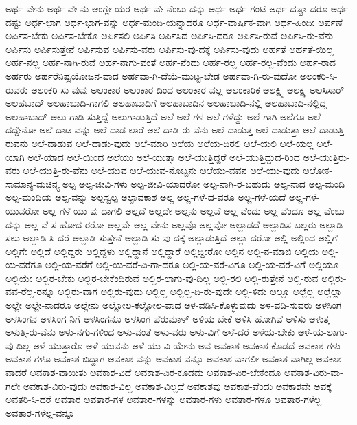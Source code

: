 {ಅರ್ಥ-ವೇನು
ಅರ್ಥ-ವೇ-ನು-ಆಂಗ್ಲೇ-ಯರ
ಅರ್ಥ-ವೇ-ನೆಂಬು-ದನ್ನು
ಅರ್ಧ
ಅರ್ಧ-ಗಂಟೆ
ಅರ್ಧ-ದಷ್ಟಾ-ದರೂ
ಅರ್ಧ-ದಷ್ಟು
ಅರ್ಧ-ಭಾಗ
ಅರ್ಧ-ಭಾಗ-ವನ್ನು
ಅರ್ಧ-ಮಂದಿ-ಯನ್ನಾದರೂ
ಅರ್ಧ-ವಾರ್ಷಿಕ-ವಾಗಿ
ಅರ್ಧ-ಹಿಂದೀ
ಅರ್ಪಣೆ
ಅರ್ಪಿಸ-ಬೇಕು
ಅರ್ಪಿಸ-ಬೇಕೊ
ಅರ್ಪಿಸಲಿ
ಅರ್ಪಿಸಿ
ಅರ್ಪಿಸಿದ
ಅರ್ಪಿಸಿ-ದರೂ
ಅರ್ಪಿಸಿ-ರುವೆ
ಅರ್ಪಿಸಿ-ರು-ವೆನು
ಅರ್ಪಿಸು
ಅರ್ಪಿಸುತ್ತೇನೆ
ಅರ್ಪಿಸುವ
ಅರ್ಪಿಸು-ವರು
ಅರ್ಪಿಸು-ವು-ದಕ್ಕೆ
ಅರ್ಪಿಸು-ವುದು
ಅರ್ಹತೆ
ಅರ್ಹತೆ-ಯಿಲ್ಲ
ಅರ್ಹ-ನಲ್ಲ
ಅರ್ಹ-ನಾಗಿ-ರುವೆ
ಅರ್ಹ-ನಾಗು-ವಂತೆ
ಅರ್ಹ-ನೆಂದು
ಅರ್ಹ-ರಲ್ಲ
ಅರ್ಹ-ರಲ್ಲ-ವೆಂದು
ಅರ್ಹ-ರಾದ
ಅರ್ಹರು
ಅರ್ಹರೆನಿಷ್ಪ್ರಯೋಜನ-ವಾದ
ಅರ್ಹವಾ-ಗಿ-ದೆಯೆ-ಮುಟ್ಟ-ಬೇಡ
ಅರ್ಹವಾ-ಗಿ-ರು-ವುದೋ
ಅಲಂಕರಿ-ಸಿ-ರುವರು
ಅಲಂಕರಿ-ಸು-ವುವು
ಅಲಂಕಾರ
ಅಲಂಕಾರ-ದಿಂದ
ಅಲಂಕಾರ-ವಲ್ಲ
ಅಲಂಕಾರಿಕ
ಅಲಕ್ಷ್ಮಿ
ಅಲಕ್ಷ್ಯ
ಅಲಸಿಸಾರ್
ಅಲಹಬಾದ್
ಅಲಹಾಬಾದಿ-ಗಾಗಲಿ
ಅಲಹಾಬಾದಿಗೆ
ಅಲಹಾಬಾದಿನ
ಅಲಹಾಬಾದಿ-ನಲ್ಲಿ
ಅಲಹಾಬಾದಿ-ನಲ್ಲಿದ್ದ
ಅಲಹಾಬಾದ್
ಅಲು-ಗಾಡಿ-ಸುತ್ತಿದ್ದೆ
ಅಲುಗಾಡುತ್ತಿದೆ
ಅಲೆ
ಅಲೆ-ಗಳ
ಅಲೆ-ಗಳೆದ್ದು
ಅಲೆ-ಗಾಗಿ
ಅಲೆಗೂ
ಅಲೆ-ದದ್ದೇನೋ
ಅಲೆ-ದಾಟ-ವನ್ನು
ಅಲೆ-ದಾಡ-ಲಾರೆ
ಅಲೆ-ದಾಡಿ-ರು-ವೆನು
ಅಲೆ-ದಾಡುತ್ತ
ಅಲೆ-ದಾಡುತ್ತಾ
ಅಲೆ-ದಾಡುತ್ತಿ-ರುವನು
ಅಲೆ-ದಾಡುವ
ಅಲೆ-ದಾಡು-ವುದು
ಅಲೆ-ಮಾರಿ
ಅಲೆಯ
ಅಲೆಯ-ದಿರಲಿ
ಅಲೆ-ಯಲಿ
ಅಲೆ-ಯಲ್ಲ
ಅಲೆ-ಯಾಗಿ
ಅಲೆ-ಯಾದ
ಅಲೆ-ಯಿಂದ
ಅಲೆಯು
ಅಲೆ-ಯುತ್ತಾ
ಅಲೆ-ಯುತ್ತಿದ್ದರೆ
ಅಲೆ-ಯುತ್ತಿದ್ದುದ-ರಿಂದ
ಅಲೆ-ಯುತ್ತಿರು-ವರು
ಅಲೆ-ಯುತ್ತಿ-ರು-ವೆನು
ಅಲೆ-ಯುವ
ಅಲೆ-ಯುವ-ನೊಬ್ಬನು
ಅಲೆಯು-ವವನ
ಅಲೆ-ಯು-ವುದು
ಅಲೋಕ-ಸಾಮಾನ್ಯ-ಮಚಿನ್ತ್ಯ
ಅಲ್ಪ
ಅಲ್ಪ-ಜೀವಿ-ಗಳು
ಅಲ್ಪ-ಜೀವಿ-ಯಾದರೋ
ಅಲ್ಪ-ನಾಗಿ-ರ-ಬಹುದು
ಅಲ್ಪ-ನಾದ
ಅಲ್ಪ-ಮಂದಿ
ಅಲ್ಪ-ಮಂದಿಯ
ಅಲ್ಪ-ವನ್ನು
ಅಲ್ಪಸ್ವಲ್ಪ
ಅಲ್ಪಾವಕಾಶ
ಅಲ್ಲ
ಅಲ್ಲ-ಗಳೆ-ದ-ವರೂ
ಅಲ್ಲ-ಗಳೆ-ಯದೆ
ಅಲ್ಲ-ಗಳೆ-ಯುವರೋ
ಅಲ್ಲ-ಗಳೆ-ಯು-ವು-ದಾಗಲಿ
ಅಲ್ಲದೆ
ಅಲ್ಲದೇ
ಅಲ್ಲನು
ಅಲ್ಲವೆ
ಅಲ್ಲ-ವೆಂದು
ಅಲ್ಲ-ವೆಂದೂ
ಅಲ್ಲ-ವೆಂಬು-ದನ್ನು
ಅಲ್ಲ-ವೆ-ಸ-ಹೋದ-ರರೋ
ಅಲ್ಲವೇ
ಅಲ್ಲ-ವೇನು
ಅಲ್ಲವೊ
ಅಲ್ಲವೋ
ಅಲ್ಲಾಡದೆ
ಅಲ್ಲಾಡಿಸ-ಬಲ್ಲರು
ಅಲ್ಲಾಡಿ-ಸಲು
ಅಲ್ಲಾಡಿ-ಸಿ-ದರೆ
ಅಲ್ಲಾಡಿ-ಸುತ್ತೇನೆ
ಅಲ್ಲಾಡಿ-ಸು-ವು-ದಕ್ಕೆ
ಅಲ್ಲಾಡುತ್ತಿದೆ
ಅಲ್ಲಾ-ದರೋ
ಅಲ್ಲಿ
ಅಲ್ಲಿಂದ
ಅಲ್ಲಿಗೆ
ಅಲ್ಲಿಗೇ
ಅಲ್ಲಿದೆ
ಅಲ್ಲಿದ್ದರು
ಅಲ್ಲಿದ್ದಳು
ಅಲ್ಲಿದ್ದಾನೆ
ಅಲ್ಲಿದ್ದಾರೆ
ಅಲ್ಲಿದ್ದೀರೋ
ಅಲ್ಲಿನ
ಅಲ್ಲಿ-ನ-ಮಾಜಿ
ಅಲ್ಲಿಯ
ಅಲ್ಲಿ-ಯ-ವರೆಗೂ
ಅಲ್ಲಿ-ಯ-ವರೆಗೆ
ಅಲ್ಲಿ-ಯ-ವರೆ-ವಿ-ಗಾ-ದರೂ
ಅಲ್ಲಿ-ಯ-ವರೆ-ವಿಗೂ
ಅಲ್ಲಿ-ಯ-ವರೆ-ವಿಗೆ
ಅಲ್ಲಿಯೂ
ಅಲ್ಲಿಯೇ
ಅಲ್ಲಿರ-ಬೇಕು
ಅಲ್ಲಿರ-ಬೇಕೆಂದಿರುವೆ
ಅಲ್ಲಿರ-ಲಾಗು-ವು-ದಿಲ್ಲ
ಅಲ್ಲಿ-ರಲಿ
ಅಲ್ಲಿ-ರುತ್ತೇನೆ
ಅಲ್ಲಿ-ರುವ
ಅಲ್ಲಿರು-ವವ-ರೆಲ್ಲ-ರನ್ನೂ
ಅಲ್ಲಿರು-ವಾಗ
ಅಲ್ಲಿರು-ವುದು
ಅಲ್ಲಿಲ್ಲ
ಅಲ್ಲಿಲ್ಲ-ದಿ-ರು-ವುದೇ
ಅಲ್ಲಿ-ಳಿದು
ಅಲ್ಲೂ
ಅಲ್ಲೆಲ್ಲ
ಅಲ್ಲೆಲ್ಲಾ
ಅಲ್ಲೇ
ಅಲ್ಲೇ-ನಾದರೂ
ಅಲ್ಲೇನು
ಅಲ್ಲೋಲ-ಕಲ್ಲೋಲ-ವಾದ
ಅಳ-ವಡಿಸಿ-ಕೊಳ್ಳುವುದು
ಅಳ-ವಡಿ-ಸುವರು
ಅಳಸಿಂಗ
ಅಳಸಿಂಗನ
ಅಳಸಿಂಗ-ನಿಗೆ
ಅಳಸಿಂಗನೂ
ಅಳಸಿಂಗ-ಪೆರುಮಾಳ್
ಅಳಿಯ-ಬೇಕೆ
ಅಳಿಸಿ-ಹೋಗಿವೆ
ಅಳಿಸು
ಅಳುತ್ತ
ಅಳುತ್ತಿ-ರು-ವೆನು
ಅಳು-ನಗು-ಗಳಿಂದ
ಅಳು-ವಂತೆ
ಅಳು-ವರು
ಅಳು-ವಿಗೆ
ಅಳೆ-ದರೆ
ಅಳೆಯ-ಬೇಕು
ಅಳೆ-ಯ-ಲಾಗು-ವು-ದಿಲ್ಲ
ಅಳೆ-ಯುತ್ತಾರೊ
ಅಳೆ-ಯುವನು
ಅಳೆ-ಯು-ವಿ-ಯೇನು
ಅವ
ಅವಕಾಶ
ಅವಕಾಶ-ಕೊಡದೆ
ಅವಕಾಶ-ಗಳು
ಅವಕಾಶ-ಗಳೂ
ಅವಕಾಶ-ಬಿದ್ದಾಗ
ಅವಕಾಶ-ವನ್ನು
ಅವಕಾಶ-ವನ್ನೂ
ಅವಕಾಶ-ವಾಗಲೀ
ಅವಕಾಶ-ವಾಗಿಲ್ಲ
ಅವಕಾಶ-ವಾದರೆ
ಅವಕಾಶ-ವಾಯಿತು
ಅವಕಾಶ-ವಿದೆ
ಅವಕಾಶ-ವಿರ-ಕೂಡದು
ಅವಕಾಶ-ವಿರ-ಬೇಕೆಂದೂ
ಅವಕಾಶ-ವಿರು-ವಾ-ಗಲೇ
ಅವಕಾಶ-ವಿರು-ವುದು
ಅವಕಾಶ-ವಿಲ್ಲ
ಅವಕಾಶ-ವಿಲ್ಲದೆ
ಅವಕಾಶವು
ಅವಕಾಶ-ವೆಂದು
ಅವಕಾಶವೇ
ಅವಕ್ಕೆ
ಅವತರಿ-ಸಿ-ದರೆ
ಅವತಾರ
ಅವತಾರ-ಗಳ
ಅವತಾರ-ಗಳನ್ನು
ಅವತಾರ-ಗಳು
ಅವತಾರ-ಗಳೂ
ಅವತಾರ-ಗಳೆಲ್ಲ
ಅವತಾರ-ಗಳೆಲ್ಲ-ವನ್ನೂ
}
